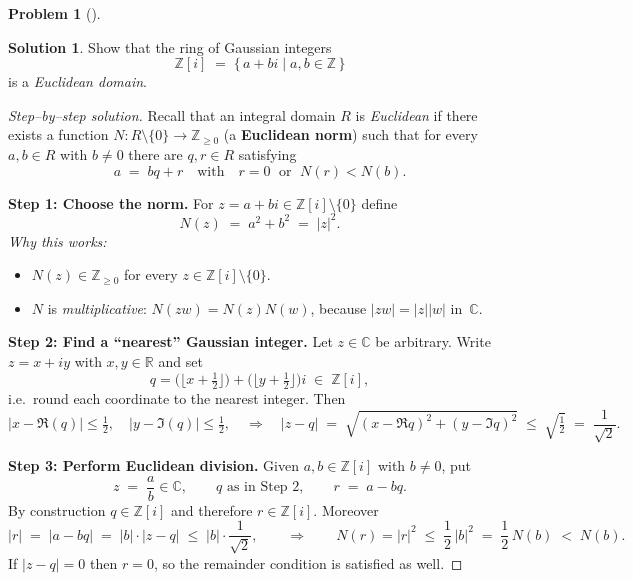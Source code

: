 \documentclass[12pt]{article}
\theoremstyle{definition} %
\newtheorem{solution}{Solution}
\newtheorem{problem}{Problem}
\theoremstyle{plain} %
\begin{document}
\begin{problem}[]
  
\end{problem}
\begin{solution}
    Show that the ring of Gaussian integers
    \[
      \mathbb{Z}[i]\;=\;\{\,a+bi \mid a,b\in\mathbb{Z}\,\}
    \]
    is a \emph{Euclidean domain}.
    
    \begin{proof}[Step–by–step solution]
    Recall that an integral domain $R$ is \emph{Euclidean} if there exists a
    function $N:R\setminus\{0\}\to\mathbb{Z}_{\ge 0}$ (a \textbf{Euclidean norm})
    such that for every $a,b\in R$ with $b\neq 0$ there are $q,r\in R$ satisfying
    \[
      a \;=\; bq + r
      \quad\text{with}\quad
      r=0\;\text{ or }\;N(r)<N(b).
    \]
    
    \bigskip
    \textbf{Step 1:  Choose the norm.}\newline
    For $z=a+bi\in\mathbb{Z}[i]\setminus\{0\}$ define
    \[
      N(z)\;=\;a^{2}+b^{2}\;=\;|z|^{2}.
    \]
    \emph{Why this works:}
    \begin{itemize}
      \item $N(z)\in\mathbb{Z}_{\ge 0}$ for every $z\in\mathbb{Z}[i]\setminus\{0\}$.
      \item $N$ is \emph{multiplicative}: $N(zw)=N(z)N(w)$, because
            $|zw|=|z||w|$ in~$\mathbb{C}$.
    \end{itemize}
    
    \bigskip
    \textbf{Step 2:  Find a “nearest” Gaussian integer.}\newline
    Let $z\in\mathbb{C}$ be arbitrary.  Write $z=x+iy$ with $x,y\in\mathbb{R}$ and set
    \[
      q=\bigl(\!\lfloor x+\tfrac12 \rfloor\bigr)
         +
         \bigl(\!\lfloor y+\tfrac12 \rfloor\bigr)i
         \;\in\;\mathbb{Z}[i],
    \]
    i.e.\ round each coordinate to the nearest integer.
    Then
    \[
      |x-\Re(q)|\le \tfrac12,
      \quad
      |y-\Im(q)|\le \tfrac12,
      \quad\Longrightarrow\quad
      |z-q|
      \;=\;
      \sqrt{(x-\Re q)^{2}+(y-\Im q)^{2}}
      \;\le\;
      \sqrt{\tfrac12}
      \;=\;
      \frac{1}{\sqrt{2}}.
    \]
    
    \bigskip
    \textbf{Step 3:  Perform Euclidean division.}\newline
    Given $a,b\in\mathbb{Z}[i]$ with $b\neq 0$, put
    \[
      z \;=\; \frac{a}{b}\in\mathbb{C},
      \qquad
      q \text{ as in Step 2},
      \qquad
      r \;=\; a-bq.
    \]
    By construction $q\in\mathbb{Z}[i]$ and therefore $r\in\mathbb{Z}[i]$.
    Moreover
    \[
      |r|
      \;=\;
      |a-bq|
      \;=\;
      |b|\cdot\bigl|z-q\bigr|
      \;\le\;
      |b|\cdot\frac1{\sqrt{2}},
      \qquad\Longrightarrow\qquad
      N(r)=|r|^{2}\;\le\;\frac12\,|b|^{2}\;=\;\frac12\,N(b)\;<\;N(b).
    \]
    If $|z-q|=0$ then $r=0$, so the remainder condition is satisfied as well.
    

\end{proof}
\end{solution}
\end{document}
